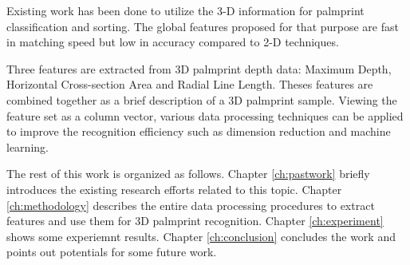 Existing work has been done to utilize the 3-D information for palmprint classification and sorting. The global features proposed for that purpose are fast in matching speed but low in accuracy compared to 2-D techniques.

Three features are extracted from 3D palmprint depth data: Maximum Depth, Horizontal Cross-section Area and Radial Line Length. Theses features are combined together as a brief description of a 3D palmprint sample. Viewing the feature set as a column vector, various data processing techniques can be applied to improve the recognition efficiency such as dimension reduction and machine learning.


The rest of this work is organized as follows. Chapter \ref{ch:pastwork} briefly introduces the existing research efforts related to this topic. Chapter \ref{ch:methodology} describes the entire data processing procedures to extract features and use them for 3D palmprint recognition. Chapter \ref{ch:experiment} shows some experiemnt results. Chapter \ref{ch:conclusion} concludes the work and points out potentials for some future work.
